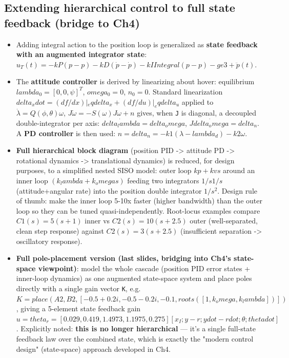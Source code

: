 \documentclass[11pt]{article}
\begin{document}
\subsection{Extending hierarchical control to full state feedback (bridge to Ch4)}
\begin{itemize}
\item Adding integral action to the position loop is generalized as \textbf{state feedback with an augmented integrator state}: $u_T(t) = -kP (p-p ) - kD (\dot{p}-\dot{p} ) - kI Integral(p-p ) - g e3 + \ddot{p} (t)$.
\item The \textbf{attitude controller} is derived by linearizing about hover: equilibrium $lambda_0 = [0,0,\psi ]^T$, $omega_0 = 0$, $n_0 = 0$. Standard linearization $delta_xdot = (df/dx)|_eq   delta_x + (df/du)|_eq   delta_u$ applied to $\dot{\lambda} = Q(\phi,\theta) \omega$, $J \dot{\omega} = -S(\omega) J \omega + n$ gives, when \texttt{J} is diagonal, a decoupled double-integrator per axis: $\dot{delta_lambda} = delta_omega$, $J \dot{delta_omega} = delta_n$. A \textbf{PD controller} is then used: $n = delta_n = -k1 (\lambda - lambda_d) - k2 \omega$.
\item \textbf{Full hierarchical block diagram} (position PID -> attitude PD -> rotational dynamics -> translational dynamics) is reduced, for design purposes, to a simplified nested SISO model: outer loop $kp + kv s$ around an inner loop $(k_lambda + k_omega s)$ feeding two integrators $1/s   1/s$ (attitude+angular rate) into the position double integrator $1/s^2$. Design rule of thumb: make the inner loop 5-10x faster (higher bandwidth) than the outer loop so they can be tuned quasi-independently. Root-locus examples compare $C1(s)=5(s+1)$ inner vs $C2(s)=10(s+2.5)$ outer (well-separated, clean step response) against $C2(s)=3(s+2.5)$ (insufficient separation -> oscillatory response).
\item \textbf{Full pole-placement version (last slides, bridging into Ch4's state-space viewpoint)}: model the whole cascade (position PID error states + inner-loop dynamics) as one augmented state-space system and place poles directly with a single gain vector \texttt{K}, e.g. $K = place(A2, B2, [-0.5+0.2i, -0.5-0.2i, -0.1, roots([1, k_omega, k_lambda])])$, giving a 5-element state feedback gain $u = theta_r = [0.029, 0.419, 1.4973, 1.1975, 0.275]   [x_I; y-r; ydot-rdot; \theta; thetadot]$. Explicitly noted: \textbf{this is no longer hierarchical} — it's a single full-state feedback law over the combined state, which is exactly the "modern control design" (state-space) approach developed in Ch4.
\end{itemize}
\end{document}
